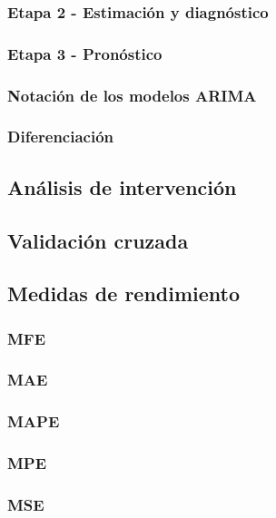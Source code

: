 \documentclass[
]{article}
\begin{document}
\subsubsection{Etapa 2 - Estimación y diagnóstico}

\subsubsection{Etapa 3 - Pronóstico}

\subsubsection{Notación de los modelos ARIMA}

\subsubsection{Diferenciación}

\subsection{Análisis de intervención}

\subsection{Validación cruzada}

\subsection{Medidas de rendimiento}

\subsubsection{MFE}

\subsubsection{MAE}

\subsubsection{MAPE}

\subsubsection{MPE}

\subsubsection{MSE}
\end{document}
